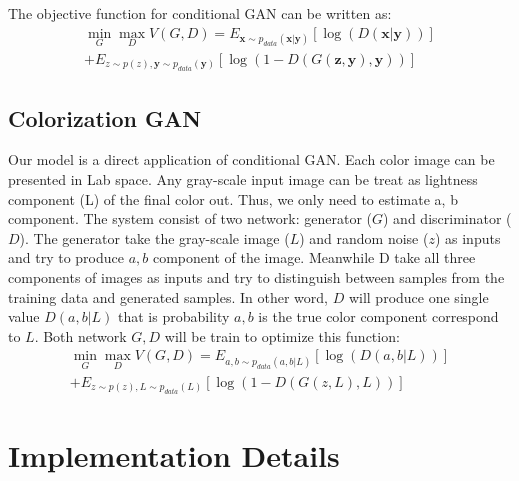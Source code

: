 \documentclass[10pt,twocolumn,letterpaper]{article}
\begin{document}
The objective function for conditional GAN can be written as:
\begin{align}
 \min_{G} \max_{D} V(G,D) = E_{\mathbf{x} \sim p_{data}(\mathbf{x} | \mathbf{y})} [\log(D(\mathbf{x}|\mathbf{y}))] \nonumber \\
+  E_{z \sim p(z), \mathbf{y} \sim p_{data}(\mathbf{y}) } [\log(1-D(G(\mathbf{z,y}),\mathbf{y}))]
\end{align}

\subsection{Colorization GAN}

Our model is a direct application of conditional GAN. Each color image can be presented in Lab space. Any gray-scale input image can be treat as lightness component (L) of the final color out. Thus, we only need to estimate a, b component. The system consist of two network: generator ($G$) and discriminator ($D$). The generator take the gray-scale image ($L$) and random noise ($z$) as inputs and try to produce $a, b$ component of the image. Meanwhile D take all three components of images as inputs and try to distinguish between samples from the training data and generated samples. In other word, $D$ will produce one single value $D(a,b|L)$ that is probability $a, b$ is the true color component correspond to $L$. Both network $G, D$ will be train to optimize this function:
\begin{align}
 \min_{G} \max_{D} V(G,D) =  E_{a, b \sim p_{data}(a,b | L)} [\log(D(a,b|L))] \nonumber \\
                          + E_{z \sim p(z), L \sim p_{data}(L) } [\log(1-D(G(z,L),L))]
\end{align}




\section{Implementation Details}
\end{document}
